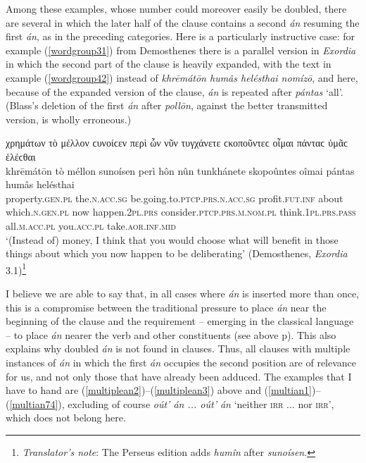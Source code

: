 Among these examples, whose number could moreover easily be doubled, there are several in which the later half of the clause contains a second \emph{án} resuming the first \emph{án}, as in the preceding categories. Here is a particularly instructive case: for example (\ref{wordgroup31}) from Demosthenes there is a parallel version in \textit{Exordia} in which the second part of the clause is heavily expanded, with the text in example (\ref{wordgroup42}) instead of \textit{khrēmátōn humâs helésthai nomízō}, and here, because of the expanded version of the clause, \emph{án} is repeated after \emph{pántas} `all'. (Blass's \citeyearpar[360]{DindorfBlass1892} deletion of the first \emph{án} after \emph{pollōn}, against the better transmitted version, is wholly erroneous.)

\begin{exe}
\ex χρημάτων τὸ μέλλον ϲυνοίϲεν περὶ ὧν νῦν τυγχάνετε ϲκοποῦντεϲ οἶμαι πάνταϲ ὑμᾶϲ ἑλέϲθαι\\
\gll khrēmátōn tò méllon sunoísen perì hôn nûn tunkhánete skopoûntes oîmai pántas humâs helésthai\\
property.\textsc{gen.pl} the.\textsc{n.acc.sg} be.going.to.\textsc{ptcp.prs.n.acc.sg} profit.\textsc{fut.inf} about which.\textsc{n.gen.pl} now happen.\textsc{2pl.prs} consider.\textsc{ptcp.prs.m.nom.pl} think.\textsc{1pl.prs.pass} all.\textsc{m.acc.pl} you.\textsc{acc.pl} take.\textsc{aor.inf.mid}\\
\trans `(Instead of) money, I think that you would choose what will benefit in those things about which you now happen to be deliberating' (Demosthenes, \textit{Exordia} 3.1)\footnote{\emph{Translator's note}: The Perseus edition adds \textit{humîn} after \textit{sunoísen}.}
\label{wordgroup42}
\end{exe}

I believe we are able to say that, in all cases where \emph{án} is inserted more than once, this is a compromise between the traditional pressure to place \emph{án} near the beginning of the clause and the requirement -- emerging in the classical language -- to place \emph{án} nearer the verb and other constituents (see above p\pageref{posthomerican}). This also explains why doubled \emph{án} is not found in  clauses. Thus, all clauses with multiple instances of \emph{án} in which the first \emph{án} occupies the second position are of relevance for us, and not only those that have already been adduced. The examples that I have to hand are (\ref{multiplean2})--(\ref{multiplean3}) above and (\ref{multian1})--(\ref{multian74}), excluding of course \emph{oút' án ... oút' án} `neither \textsc{irr} ... nor \textsc{irr}', which does not belong here.


